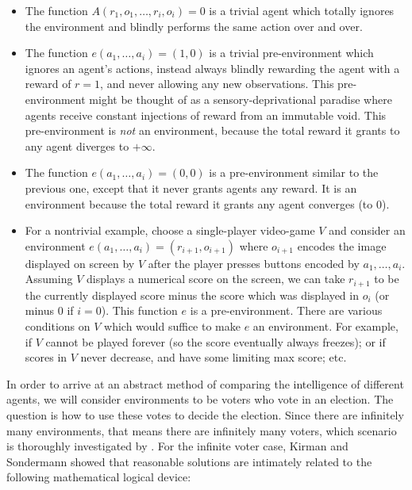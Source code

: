 \documentclass[twoside,11pt]{article}
\begin{document}
\begin{example}
    \begin{itemize}
        \item The function $A(r_1,o_1,\ldots,r_i,o_i)=0$ is a trivial agent which
        totally ignores the environment and blindly performs the same action
        over and over.
        \item The function $e(a_1,\ldots,a_i)=(1,0)$ is a trivial pre-environment
        which ignores an agent's actions, instead always blindly rewarding the agent
        with a reward of $r=1$, and never allowing any new observations. This
        pre-environment might be thought of as a sensory-deprivational paradise
        where agents receive constant injections of reward from an immutable void.
        This pre-environment is \emph{not} an environment, because the total reward
        it grants to any agent diverges to $+\infty$.
        \item The function $e(a_1,\ldots,a_i)=(0,0)$ is a pre-environment similar to
        the previous one, except that it never grants agents any reward. It is an
        environment because the total reward it grants any agent converges (to $0$).
        \item For a nontrivial example, choose a single-player video-game $V$ and 
        consider an environment $e(a_1,\ldots,a_i)=(r_{i+1},o_{i+1})$
        where $o_{i+1}$ encodes the image displayed on screen
        by $V$ after the player presses buttons encoded by $a_1,\ldots,a_i$.
        Assuming $V$ displays a numerical score on the screen,
        we can take $r_{i+1}$ to be the currently displayed score minus the score which was
        displayed in $o_i$ (or minus $0$
        if $i=0$). This function $e$ is a pre-environment. There are various
        conditions on $V$ which would suffice to make $e$ an environment. For example,
        if $V$ cannot be played forever (so the score eventually always freezes);
        or if scores in $V$ never decrease, and have some limiting max score;
        etc.
    \end{itemize}
\end{example}

In order to arrive at an abstract method of comparing the intelligence of different
agents, we will consider environments to be voters who vote in an election.
The question is how to use these votes to decide the election.
Since there are infinitely many environments, that means there are infinitely many voters,
which scenario is thoroughly investigated by \citet{kirman}.
For the infinite voter case, Kirman and Sondermann showed that
reasonable solutions are intimately
related to the following mathematical logical device:
\end{document}
